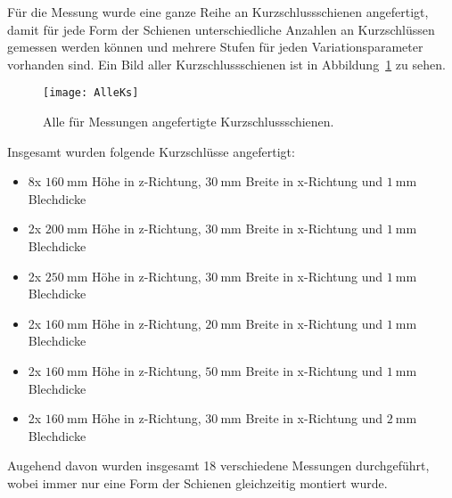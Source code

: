 F\"ur die Messung wurde eine ganze Reihe an Kurzschlussschienen angefertigt, damit f\"ur jede Form der Schienen unterschiedliche Anzahlen an Kurzschl\"ussen gemessen werden k\"onnen und mehrere Stufen f\"ur jeden Variationsparameter vorhanden sind. Ein Bild aller Kurzschlussschienen ist in Abbildung~\ref{fig:AlleKs} zu sehen.
\par
\begin{figure}[htb]
	\centering
	\texttt{[image: AlleKs]}
	\caption{Alle f\"ur Messungen angefertigte Kurzschlussschienen.}
	\label{fig:AlleKs}
\end{figure}
Insgesamt wurden folgende Kurzschl\"usse angefertigt:
\par
\begin{itemize}
	\item 8x $\SI{160}{\milli\meter}$ H\"ohe in z-Richtung, $\SI{30}{\milli\meter}$ Breite in x-Richtung und $\SI{1}{\milli\meter}$ Blechdicke
	\item 2x $\SI{200}{\milli\meter}$ H\"ohe in z-Richtung, $\SI{30}{\milli\meter}$ Breite in x-Richtung und $\SI{1}{\milli\meter}$ Blechdicke
	\item 2x $\SI{250}{\milli\meter}$ H\"ohe in z-Richtung, $\SI{30}{\milli\meter}$ Breite in x-Richtung und $\SI{1}{\milli\meter}$ Blechdicke
	\item 2x $\SI{160}{\milli\meter}$ H\"ohe in z-Richtung, $\SI{20}{\milli\meter}$ Breite in x-Richtung und $\SI{1}{\milli\meter}$ Blechdicke
	\item 2x $\SI{160}{\milli\meter}$ H\"ohe in z-Richtung, $\SI{50}{\milli\meter}$ Breite in x-Richtung und $\SI{1}{\milli\meter}$ Blechdicke
	\item 2x $\SI{160}{\milli\meter}$ H\"ohe in z-Richtung, $\SI{30}{\milli\meter}$ Breite in x-Richtung und $\SI{2}{\milli\meter}$ Blechdicke
\end{itemize}
Augehend davon wurden insgesamt 18 verschiedene Messungen durchgef\"uhrt, wobei immer nur eine Form der Schienen gleichzeitig montiert wurde.


\newpage



